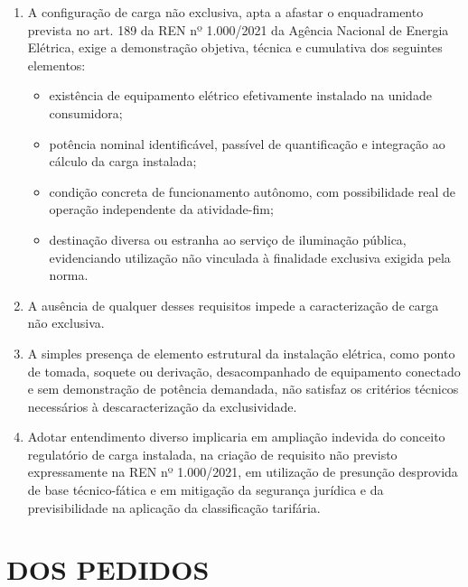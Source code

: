 \begin{enumerate}[resume]

    \item A configuração de carga não exclusiva, apta a afastar o enquadramento prevista no art. 189 da REN nº 1.000/2021 da Agência Nacional de Energia Elétrica, exige a demonstração objetiva, técnica e cumulativa dos seguintes elementos:

    \begin{itemize}
        \item existência de equipamento elétrico efetivamente instalado na unidade consumidora;

        \item potência nominal identificável, passível de quantificação e integração ao cálculo da carga instalada;

        \item condição concreta de funcionamento autônomo, com possibilidade real de operação independente da atividade-fim;

        \item destinação diversa ou estranha ao serviço de iluminação pública, evidenciando utilização não vinculada à finalidade exclusiva exigida pela norma.
    \end{itemize}

    \item A ausência de qualquer desses requisitos impede a caracterização de carga não exclusiva.

    \item A simples presença de elemento estrutural da instalação elétrica, como ponto de tomada, soquete ou derivação, desacompanhado de equipamento conectado e sem demonstração de potência demandada, não satisfaz os critérios técnicos necessários à descaracterização da exclusividade.

    \item Adotar entendimento diverso implicaria em ampliação indevida do conceito regulatório de carga instalada, na criação de requisito não previsto expressamente na REN nº 1.000/2021, em utilização de presunção desprovida de base técnico-fática e em mitigação da segurança jurídica e da previsibilidade na aplicação da classificação tarifária.

\end{enumerate}

\section{DOS PEDIDOS}

